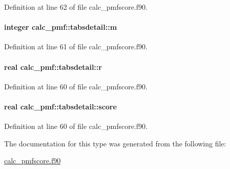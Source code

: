 Definition at line 62 of file calc\-\_\-pmfscore.\-f90.

\hypertarget{structcalc__pmf_1_1tabsdetail_a1121f13bbe31eafc5514fb22a8385790}{
\paragraph[{m}]{\setlength{\rightskip}{0pt plus 5cm}integer calc\-\_\-pmf\-::tabsdetail\-::m}}\label{structcalc__pmf_1_1tabsdetail_a1121f13bbe31eafc5514fb22a8385790}


Definition at line 61 of file calc\-\_\-pmfscore.\-f90.

\hypertarget{structcalc__pmf_1_1tabsdetail_a029eaf86b3a411548dba509a47811640}{
\paragraph[{r}]{\setlength{\rightskip}{0pt plus 5cm}real calc\-\_\-pmf\-::tabsdetail\-::r}}\label{structcalc__pmf_1_1tabsdetail_a029eaf86b3a411548dba509a47811640}


Definition at line 60 of file calc\-\_\-pmfscore.\-f90.

\hypertarget{structcalc__pmf_1_1tabsdetail_a1e4395c9e5fa17026c93e0c186a64525}{
\paragraph[{score}]{\setlength{\rightskip}{0pt plus 5cm}real calc\-\_\-pmf\-::tabsdetail\-::score}}\label{structcalc__pmf_1_1tabsdetail_a1e4395c9e5fa17026c93e0c186a64525}


Definition at line 60 of file calc\-\_\-pmfscore.\-f90.



The documentation for this type was generated from the following file\-:\begin{DoxyCompactItemize}
\item 
\hyperlink{calc__pmfscore_8f90}{calc\-\_\-pmfscore.\-f90}\end{DoxyCompactItemize}

